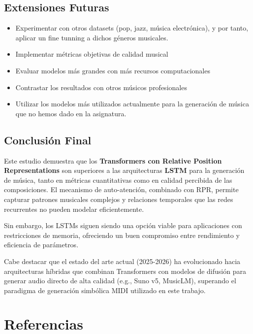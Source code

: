 \documentclass[12pt,a4paper]{article}
\begin{document}
\subsection{Extensiones Futuras}

\begin{itemize}
    \item Experimentar con otros datasets (pop, jazz, música electrónica), y por tanto, aplicar un fine tunning a dichos géneros musicales.
    \item Implementar métricas objetivas de calidad musical
    \item Evaluar modelos más grandes con más recursos computacionales
    \item Contrastar los resultados con otros músicos profesionales
    \item Utilizar los modelos más utilizados actualmente para la generación de música que no hemos dado en la asignatura.
\end{itemize}

\subsection{Conclusión Final}

Este estudio demuestra que los \textbf{Transformers con Relative Position Representations} son superiores a las arquitecturas \textbf{LSTM} para la generación de música, tanto en métricas cuantitativas como en calidad percibida de las composiciones. El mecanismo de auto-atención, combinado con RPR, permite capturar patrones musicales complejos y relaciones temporales que las redes recurrentes no pueden modelar eficientemente.

Sin embargo, los LSTMs siguen siendo una opción viable para aplicaciones con restricciones de memoria, ofreciendo un buen compromiso entre rendimiento y eficiencia de parámetros.

Cabe destacar que el estado del arte actual (2025-2026) ha evolucionado
hacia arquitecturas híbridas que combinan Transformers con modelos de
difusión para generar audio directo de alta calidad (e.g., Suno v5,
MusicLM), superando el paradigma de generación simbólica MIDI
utilizado en este trabajo.

\section*{Referencias}
\end{document}
